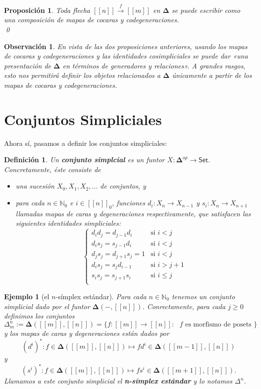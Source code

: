 \documentclass[11pt]{report}
\theoremstyle{colored}
\newtheorem{definition}{Definición}[section]
\newtheorem{proposition}{Proposición}[section]
\newtheorem{remark}{Observación}[section]
\newtheorem{example}{Ejemplo}[section]
\newcommand{\N}{\mathbb{N}}
\newcommand{\nat}[1]{[\![#1]\!]}
\newcommand{\ord}[1]{\nat{#1}}
\newcommand{\natzero}[1]{\nat{#1}_0}
\newcommand{\cat}[1]{\mathsf{#1}}
\renewcommand{\ss}[1]{\Delta^{#1}}
\newcommand{\ordcat}{\boldsymbol{\Delta}}
\begin{document}
\begin{proposition} Toda flecha $\ord{n} \xrightarrow{f} \ord{m}$ en $\ordcat$ se puede escribir como una composición de mapas de cocaras y codegeneraciones. \\ \qed
\end{proposition}

\begin{remark} En vista de las dos proposiciones anteriores,  usando los mapas de cocaras y codegeneraciones y las identidades cosimpliciales se puede dar «una presentación de $\ordcat$ en términos de generadores y relaciones». A grandes rasgos, esto nos permitirá definir los objetos relacionados a $\ordcat$ únicamente a partir de los mapas de cocaras y codegeneraciones.
\end{remark}

\section{Conjuntos Simpliciales}

Ahora sí, pasamos a definir los conjuntos simpliciales:

\begin{definition} Un \textbf{conjunto simplcial} es un funtor $X : \ordcat^{op} \to \cat{Set}$. Concretamente, éste consiste de 
\begin{itemize}
\item[(i)] una sucesión $X_0,X_1,X_2, \dots$ de conjuntos, y \item[(ii)] para cada $n \in \N_0$ e $i \in \natzero{n}$, funciones 
$d_i : X_n \to X_{n-1}$ y $s_i : X_n \to X_{n+1}$ llamadas mapas de caras y degeneraciones respectivamente, que satisfacen las siguientes \textit{identidades simpliciales}:
\[
\begin{cases}
d_id_j = d_{j-1}d_i &\text{si $i < j$}\\
d_is_j = s_{j-1}d_i &\text{si $i < j$}\\
d_js_j = d_{j+1}s_j = 1 &\text{si $i < j$}\\
d_is_j = s_jd_{i-1} &\text{si $i > j+1$}\\
s_is_j = s_{j+1}s_i &\text{si $i \leq j$}\\
\end{cases}
\] 
\end{itemize}
\end{definition}

\begin{example}[el $n$-símplex estándar] Para cada $n \in \N_0$ tenemos un conjunto simplicial dado por el funtor $\ordcat(-,\ord{n})$. Conrectamente, para cada $j \geq 0$ definimos los conjuntos
\[
\ss{n}_m := \ordcat(\ord{m},\ord{n}) = \{f : \ord{m} \to \ord{n} : \text{ $f$ es morfismo de posets } \}
\]
y los mapas de caras y degeneraciones están dados por
\[
(d^i)^* : f \in \ordcat(\ord{m},\ord{n}) \mapsto fd^i \in \ordcat(\ord{m-1},\ord{n})
\]
y
\[
(s^i)^* : f \in \ordcat(\ord{m},\ord{n}) \mapsto fs^i \in \ordcat(\ord{m+1},\ord{n}).
\]
Llamamos a este conjunto simplicial el \textbf{n-símplex estándar} y lo notamos $\ss{n}$.
\end{example}
\end{document}
